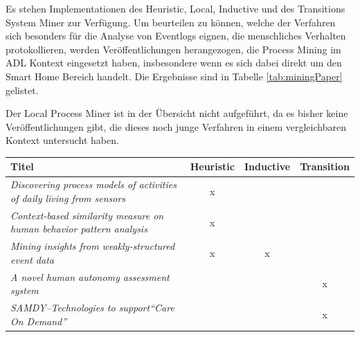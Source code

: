 Es stehen Implementationen des Heuristic, Local, Inductive und des Transitions System Miner zur Verfügung. Um beurteilen zu können, welche der Verfahren sich besonders für die Analyse von Eventlogs eignen, die menschliches Verhalten protokollieren, werden Veröffentlichungen herangezogen, die Process Mining im ADL Kontext eingesetzt haben, insbesondere wenn es sich dabei direkt um den Smart Home Bereich handelt. Die Ergebnisse sind in Tabelle \ref{tab:miningPaper} gelistet. 

Der Local Process Miner ist in der Übersicht nicht aufgeführt, da es bisher keine Veröffentlichungen gibt, die dieses noch junge Verfahren in einem vergleichbaren Kontext untersucht haben. 

\newcolumntype{b}{X}
\begin{table}[ht]\small
\centering
\begin{tabularx}{\textwidth}{b ccc}
Titel                                                                                                               & \multicolumn{1}{l}{\textbf{Heuristic}} & \multicolumn{1}{l}{\textbf{Inductive}} & \multicolumn{1}{l}{\textbf{Transition}} \\ \hline\hline
\textit{Discovering process models of activities of daily living from sensors}                                      & x                                      &                                        &                                         \\
\textit{Context-based similarity measure on human behavior pattern analysis}                                        & x                                      &                                        &                                         \\
\textit{Mining insights from weakly-structured event data}                                                          & x                                      & x                                      &                                         \\
\textit{A novel human autonomy assessment system}                                                                   &                                        &                                        & x                                       \\
\textit{SAMDY–Technologies to support“Care On Demand”}                                                              &                                        &                                        & x                                       \\

\end{tabularx}
\end{table}

